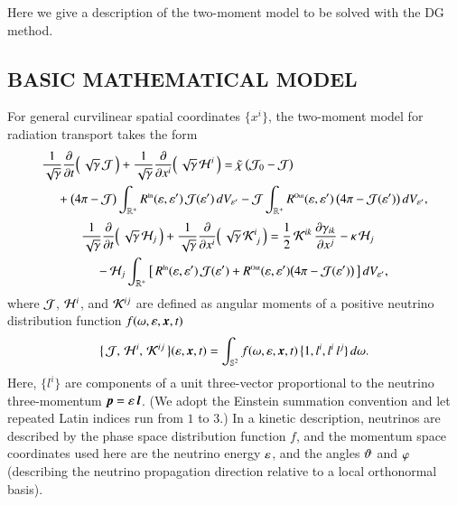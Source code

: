 \documentclass[11pt,letterpaper,twoside,english,final]{article}
\begin{document}
Here we give a description of the two-moment model to be solved with the DG method.  

\subsection{BASIC MATHEMATICAL MODEL}

For general curvilinear spatial coordinates $\{x^{i}\}$, the two-moment model for radiation transport takes the form \citep[see, e.g.,][for fully general relativistic treatments]{shibata_etal_2011,cardall_etal_2013a}
\begin{align}
  &\frac{1}{\sqrt{\gamma}}\frac{\partial }{\partial t}\Big(\,\sqrt{\gamma}\,\mathcal{J}\,\Big)
  +\frac{1}{\sqrt{\gamma}}\frac{\partial }{\partial x^{i}}\Big(\,\sqrt{\gamma}\,\mathcal{H}^{i}\,\Big)
  =\tilde{\chi}\,\big(\mathcal{J}_{0}-\mathcal{J}\big) \nonumber \\
  &\hspace{12pt}
  +\big(4\pi-\mathcal{J}\big)\int_{\mathbb{R}^{+}}R^{\mbox{\tiny In}}(\varepsilon,\varepsilon')\,\mathcal{J}(\varepsilon')\,dV_{\varepsilon'}
  -\mathcal{J}\int_{\mathbb{R}^{+}}R^{\mbox{\tiny Out}}(\varepsilon,\varepsilon')\,\big(4\pi-\mathcal{J}(\varepsilon')\big)\,dV_{\varepsilon'},
  \label{eq:momentEquationEnergy}
\end{align}
\begin{align}
  &\frac{1}{\sqrt{\gamma}}\frac{\partial }{\partial t}\Big(\,\sqrt{\gamma}\,\mathcal{H}_{j}\,\Big)
  +\frac{1}{\sqrt{\gamma}}\frac{\partial }{\partial x^{i}}\Big(\,\sqrt{\gamma}\,\mathcal{K}^{i}_{~j}\,\Big)
  =\frac{1}{2}\,\mathcal{K}^{ik}\,\frac{\partial \gamma_{ik}}{\partial x^{j}}-\kappa\,\mathcal{H}_{j} \nonumber \\
  &\hspace{12pt}
  -\mathcal{H}_{j}\int_{\mathbb{R}^{+}}\big[\,R^{\mbox{\tiny In}}(\varepsilon,\varepsilon')\,\mathcal{J}(\varepsilon')+R^{\mbox{\tiny Out}}(\varepsilon,\varepsilon')\big(4\pi-\mathcal{J}(\varepsilon')\big)\,\big]\,dV_{\varepsilon'},
  \label{eq:momentEquationMomentum}
\end{align}
where $\mathcal{J}$, $\mathcal{H}^{i}$, and $\mathcal{K}^{ij}$ are defined as angular moments of a positive neutrino distribution function $f(\omega,\varepsilon,\boldsymbol{x},t)$
\begin{equation}
  \big\{\,\mathcal{J},\,\mathcal{H}^{i},\,\mathcal{K}^{ij}\,\big\}(\varepsilon,\boldsymbol{x},t)
  =\int_{\mathbb{S}^{2}}f(\omega,\varepsilon,\boldsymbol{x},t)\,\big\{1,l^{i},l^{i}\,l^{j}\}\,d\omega.  
  \label{eq:angularMoments}
\end{equation}
Here, $\{l^{i}\}$ are components of a unit three-vector proportional to the neutrino three-momentum $\boldsymbol{p}=\varepsilon\,\boldsymbol{l}$.  
(We adopt the Einstein summation convention and let repeated Latin indices run from $1$ to $3$.)
In a kinetic description, neutrinos are described by the phase space distribution function $f$, and the momentum space coordinates used here are the neutrino energy $\varepsilon$, and the angles $\vartheta$ and $\varphi$ (describing the neutrino propagation direction relative to a local orthonormal basis).  
\end{document}
